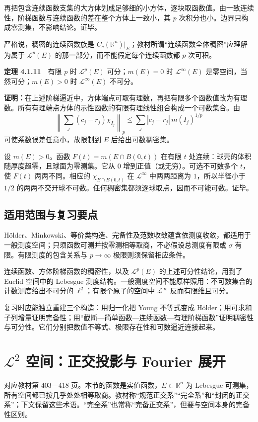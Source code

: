 \documentclass[11pt,a4paper]{article}
\begin{document}
再把包含连续函数支集的大方体划成足够细的小方体，逐块取函数值。由一致连续性，阶梯函数与连续函数的差在整个方体上一致小，其
\(p\) 次积分也小。边界只构成零测集，不影响结论。证毕。

严格说，稠密的连续函数族是
\(C_c(\mathbb R^n)|_E\)；教材所谓``连续函数全体稠密''应理解为属于
\(\mathcal L^p(E)\) 的那一部分，而不能假定每个连续函数都 \(p\) 次可积。

\textbf{定理 4.1.11}　有限 \(p\) 时 \(\mathcal L^p(E)\) 可分；\(m(E)=0\)
时 \(\mathcal L^\infty(E)\) 是零空间，当然可分；\(m(E)>0\) 时
\(\mathcal L^\infty(E)\) 不可分。

\textbf{证明：}在上述阶梯逼近中，方体端点可取有理数，再把有限多个函数值改为有理数。所有有理端点方体的示性函数的有限有理线性组合构成一个可数集合。由
\[
\left\|\sum_j(c_j-r_j)\chi_{I_j}\right\|_p
\le\sum_j|c_j-r_j|\,m(I_j)^{1/p}
\] 可使系数误差任意小，故限制到 \(E\) 后给出可数稠密集。

设 \(m(E)>0\)。函数 \(F(t)=m(E\cap B(0,t))\) 在有限 \(t\)
处连续：球壳的体积随厚度趋零，且球面为零测集。它从 \(0\)
增到正值（或无穷）。可选不可数多个 \(t\)，使 \(F(t)\) 两两不同。相应的
\(\chi_{E\cap B(0,t)}\) 在 \(\mathcal L^\infty\) 中两两距离为
\(1\)，所以半径小于 \(1/2\)
的两两不交开球不可数。任何稠密集都须逐球取点，因而不可能可数。证毕。

\subsection{适用范围与复习要点}\label{ch04-s1-ux9002ux7528ux8303ux56f4ux4e0eux590dux4e60ux8981ux70b9}

Hölder、Minkowski、等价类构造、完备性及范数收敛蕴含依测度收敛，都适用于一般测度空间；只须函数可测并按零测相等取商，不必假设总测度有限或
\(\sigma\) 有限。有限测度的包含关系与 \(p\to\infty\)
极限则须保留相应条件。

连续函数、方体阶梯函数的稠密性，以及 \(\mathcal L^p(E)\)
的上述可分性结论，用到了 Euclid 空间中的 Lebesgue
测度结构。一般测度空间不能原样照用：不可数集合的计数测度给出不可分的
\(\ell^2\)；有限个原子的空间中 \(\mathcal L^\infty\) 反而有限维且可分。

复习时应能独立重建三个构造：用归一化把 Young 不等式变成
Hölder；用可求和子列增量证明完备性；用``截断---简单函数---连续函数---有理阶梯函数''证明稠密性与可分性。它们分别把数值不等式、极限存在性和可数逼近连接起来。

\clearpage\section{\texorpdfstring{$\mathcal L^2$ 空间：正交投影与 Fourier 展开}{L2 空间：正交投影与 Fourier 展开}}
\label{ch04-s2}
对应教材第 403---418 页。本节的函数是实值函数，\(E\subset\mathbb R^n\)
为 Lebesgue
可测集，所有空间都已按几乎处处相等取商。教材称``规范正交系''``完全系''和``封闭的正交系''；下文保留这些术语。``完全系''也常称``完备正交系''，但要与空间本身的完备性区别。
\end{document}
